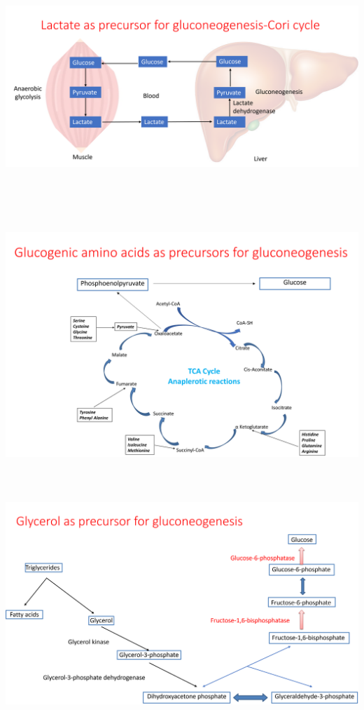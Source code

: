 \documentclass[
]{book}
\begin{document}
\includegraphics[width=\textwidth,height=3.125in]{Images/cori.png}

\includegraphics[width=\textwidth,height=4.16667in]{Images/aa.png}

\includegraphics[width=\textwidth,height=3.125in]{Images/glycerol.png}
\end{document}

